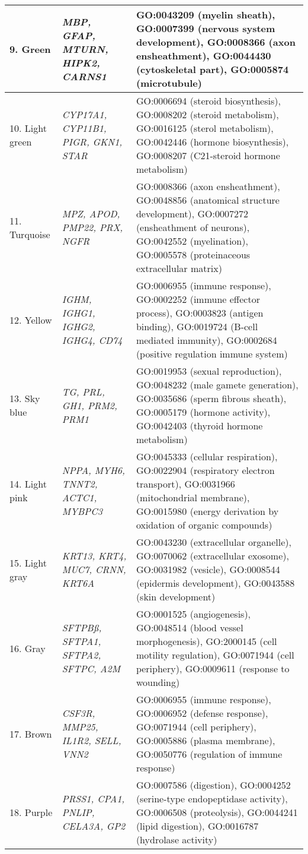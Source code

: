 \begin{table}[!hp]
\begin{adjustwidth}{-.5in}{0in}
\begin{tabular}{|p{1.0in}|p{1.5in}|p{4.3in}|}
9. Green & \textit{MBP, GFAP, MTURN, HIPK2, CARNS1} & GO:0043209 (myelin sheath), GO:0007399 (nervous system development), GO:0008366 (axon ensheathment), GO:0044430 (cytoskeletal part), GO:0005874 (microtubule) \\ \hline
10. Light green & \textit{CYP17A1, CYP11B1, PIGR, GKN1, STAR} & GO:0006694 (steroid biosynthesis), GO:0008202 (steroid metabolism), GO:0016125 (sterol metabolism), GO:0042446 (hormone biosynthesis), GO:0008207 (C21-steroid hormone metabolism) \\ \hline
11. Turquoise & \textit{MPZ, APOD, PMP22, PRX, NGFR} & GO:0008366 (axon ensheathment), GO:0048856 (anatomical structure development), GO:0007272 (ensheathment of neurons), GO:0042552 (myelination), GO:0005578 (proteinaceous extracellular matrix) \\ \hline
12. Yellow & \textit{IGHM, IGHG1, IGHG2, IGHG4, CD74} & GO:0006955 (immune response), GO:0002252 (immune effector process), GO:0003823 (antigen binding), GO:0019724 (B-cell mediated immunity), GO:0002684 (positive regulation immune system) \\ \hline
13. Sky blue & \textit{TG, PRL, GH1, PRM2, PRM1} & GO:0019953 (sexual reproduction), GO:0048232 (male gamete generation), GO:0035686 (sperm fibrous sheath), GO:0005179 (hormone activity), GO:0042403 (thyroid hormone metabolism) \\ \hline
14. Light pink & \textit{NPPA, MYH6, TNNT2, ACTC1, MYBPC3} & GO:0045333 (cellular respiration), GO:0022904 (respiratory electron transport), GO:0031966 (mitochondrial membrane), GO:0015980 (energy derivation by oxidation of organic compounds) \\ \hline
15. Light gray & \textit{KRT13, KRT4, MUC7, CRNN, KRT6A} & GO:0043230 (extracellular organelle), GO:0070062 (extracellular exosome), GO:0031982 (vesicle), GO:0008544 (epidermis development), GO:0043588 (skin development) \\ \hline
16. Gray & \textit{SFTPBß, SFTPA1, SFTPA2, SFTPC, A2M} & GO:0001525 (angiogenesis), GO:0048514 (blood vessel morphogenesis), GO:2000145 (cell motility regulation), GO:0071944 (cell periphery), GO:0009611 (response to wounding) \\ \hline
17. Brown & \textit{CSF3R, MMP25, IL1R2, SELL, VNN2} & GO:0006955 (immune response), GO:0006952 (defense response), GO:0071944 (cell periphery), GO:0005886 (plasma membrane), GO:0050776 (regulation of immune response) \\ \hline
18. Purple & \textit{PRSS1, CPA1, PNLIP, CELA3A, GP2} & GO:0007586 (digestion), GO:0004252 (serine-type endopeptidase activity), GO:0006508 (proteolysis), GO:0044241 (lipid digestion), GO:0016787 (hydrolase activity) \\ \hline 

\end{tabular}
\end{adjustwidth}
\end{table}
